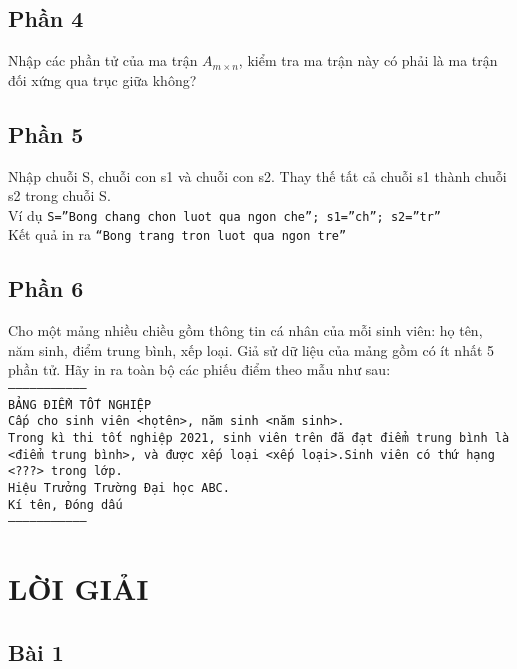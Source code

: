 \documentclass[a4paper]{article}
\begin{document}
\subsection{Phần 4}
Nhập các phần tử của ma trận $A_{m \times n}$, kiểm tra ma trận này có phải là ma trận đối xứng qua trục giữa không?\\

\subsection{Phần 5}
Nhập chuỗi S, chuỗi con s1 và chuỗi con s2. Thay thế tất cả chuỗi s1 thành chuỗi s2 trong chuỗi S.\\

Ví dụ \texttt{S=”Bong chang chon luot qua ngon che”; s1=”ch”; s2=”tr”}\\

Kết quả in ra \texttt{“Bong trang tron luot qua ngon tre”}\\

\subsection{Phần 6}
Cho một mảng nhiều chiều gồm thông tin cá nhân của mỗi sinh viên: họ tên, năm sinh, điểm trung bình, xếp loại. Giả sử dữ liệu của mảng gồm có ít nhất 5 phần tử. Hãy in ra toàn bộ các phiếu điểm theo mẫu như sau:\\
\pagebreak
\texttt{--------------------------------- \\
BẢNG ĐIỂM TỐT NGHIỆP\\
Cấp cho sinh viên <họtên>, năm sinh <năm sinh>.\\
Trong kì thi tốt nghiệp 2021, sinh viên trên đã đạt điểm trung bình là <điểm trung bình>, và được xếp loại <xếp loại>.Sinh viên có thứ hạng <???> trong lớp.\\
Hiệu Trưởng Trường Đại học ABC.\\
Kí tên, Đóng dấu\\
--------------------------------- \\}
\vfill
\pagebreak
\section{LỜI GIẢI}
\subsection{Bài 1}
\end{document}
